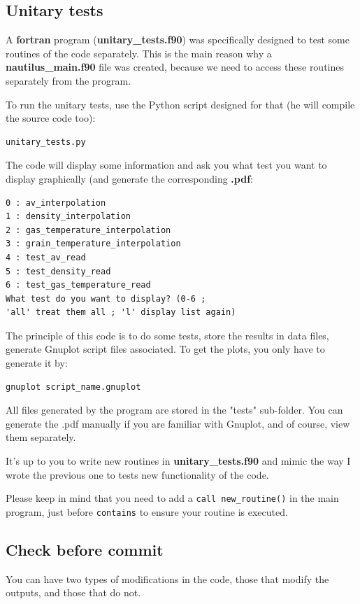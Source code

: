 \documentclass[english,a4paper,twoside]{article}
\begin{document}
\subsection{Unitary tests}\label{sec:unitary_tests}
A \textbf{fortran} program  (\textbf{unitary\_tests.f90}) was specifically designed to test some routines of the code separately. This is the main reason why a \textbf{nautilus\_main.f90} file was created, because we need to access these routines separately from the  program.

To run the unitary tests, use the Python script designed for that (he will compile the source code too): 
\begin{verbatim}
unitary_tests.py
\end{verbatim}

The code will display some information and ask you what test you want to display graphically (and generate the corresponding \textbf{.pdf}:
\begin{verbatim}
0 : av_interpolation
1 : density_interpolation
2 : gas_temperature_interpolation
3 : grain_temperature_interpolation
4 : test_av_read
5 : test_density_read
6 : test_gas_temperature_read
What test do you want to display? (0-6 ; 
'all' treat them all ; 'l' display list again)
\end{verbatim}

The principle of this code is to do some tests, store the results in data files, generate Gnuplot script files associated. To get the plots, you only have to generate it by:
\begin{verbatim}
gnuplot script_name.gnuplot
\end{verbatim}

All files generated by the program are stored in the "tests" sub-folder. You can generate the .pdf manually if you are familiar with Gnuplot, and of course, view them separately.

\begin{remarque}
It's up to you to write new routines in \textbf{unitary\_tests.f90} and mimic the way I wrote the previous one to tests new functionality of the code.

Please keep in mind that you need to add a \verb|call new_routine()| in the main program, just before \verb|contains| to ensure your routine is executed.
\end{remarque}

\subsection{Check before commit}\label{sec:compare_simulation}
You can have two types of modifications in the code, those that modify the outputs, and those that do not.
\end{document}
